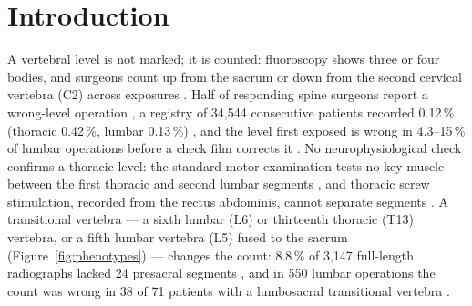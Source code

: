 
\section*{Introduction}

A vertebral level is not marked; it is counted: fluoroscopy shows three or four bodies, and surgeons count
up from the sacrum or down from the second cervical vertebra (C2) across exposures
\citep{strong2021}. Half of responding spine surgeons report a wrong-level operation \citep{mody2008}, a registry
of 34,544 consecutive patients recorded 0.12\,\% (thoracic 0.42\,\%, lumbar 0.13\,\%) \citep{furuya2026}, and the level first exposed is wrong in 4.3--15\,\% of lumbar
operations before a check film corrects it \citep{dablouk2019,ammerman2006}. No neurophysiological check confirms a thoracic
level: the standard motor examination tests no key muscle between the first thoracic and second lumbar segments
\citep{kirshblum2011}, and thoracic screw stimulation, recorded from the rectus abdominis, cannot separate
segments \citep{kulik2013}. A transitional vertebra --- a
sixth lumbar (L6) or thirteenth thoracic (T13) vertebra, or a fifth lumbar vertebra (L5) fused to the sacrum
(Figure~\ref{fig:phenotypes}) --- changes the count: 8.8\,\% of 3,147 full-length radiographs lacked 24 presacral segments
\citep{sabri2025}, and in 550 lumbar operations the count was wrong in 38 of 71 patients with a lumbosacral
transitional vertebra \citep{nakagawa2017}.

